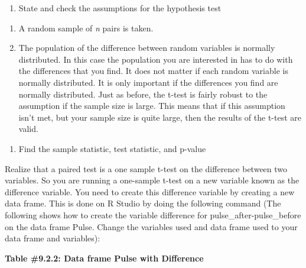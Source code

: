 \documentclass[]{book}
\newenvironment{Shaded}{\begin{snugshade}}{\end{snugshade}}
\newcommand{\DataTypeTok}[1]{\textcolor[rgb]{0.13,0.29,0.53}{#1}}
\newcommand{\KeywordTok}[1]{\textcolor[rgb]{0.13,0.29,0.53}{\textbf{#1}}}
\newcommand{\NormalTok}[1]{#1}
\newcommand{\OperatorTok}[1]{\textcolor[rgb]{0.81,0.36,0.00}{\textbf{#1}}}
\newcommand{\StringTok}[1]{\textcolor[rgb]{0.31,0.60,0.02}{#1}}
\providecommand{\tightlist}{%
  \setlength{\itemsep}{0pt}\setlength{\parskip}{0pt}}
\begin{document}
\begin{enumerate}
\def\labelenumi{\arabic{enumi}.}
\setcounter{enumi}{2}
\tightlist
\item
  State and check the assumptions for the hypothesis test
\end{enumerate}

\begin{enumerate}
\def\labelenumi{\alph{enumi}.}
\item
  A random sample of \emph{n} pairs is taken.
\item
  The population of the difference between random variables is normally distributed. In this case the population you are interested in has to do with the differences that you find. It does not matter if each random variable is normally distributed. It is only important if the differences you find are normally distributed. Just as before, the t-test is fairly robust to the assumption if the sample size is large. This means that if this assumption isn't met, but your sample size is quite large, then the results of the t-test are valid.
\end{enumerate}

\begin{enumerate}
\def\labelenumi{\arabic{enumi}.}
\setcounter{enumi}{3}
\tightlist
\item
  Find the sample statistic, test statistic, and p-value
\end{enumerate}

Realize that a paired test is a one sample t-test on the difference between two variables. So you are running a one-sample t-test on a new variable known as the difference variable. You need to create this difference variable by creating a new data frame. This is done on R Studio by doing the following command (The following shows how to create the variable difference for pulse\_after-pulse\_before on the data frame Pulse. Change the variables used and data frame used to your data frame and variables):

\textbf{Table \#9.2.2: Data frame Pulse with Difference}

\begin{Shaded}
\end{Shaded}
\end{document}
